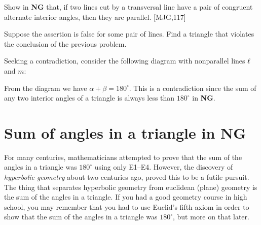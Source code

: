 \documentclass{ximera}
\begin{document}
\begin{problem}
Show in \textbf{NG} that, if two lines cut by a transversal line have
a pair of congruent alternate interior angles, then they are
parallel. [MJG,117]

\begin{hint}
Suppose the assertion is false for some pair of lines. Find a triangle
that violates the conclusion of the previous problem.
\end{hint}
\begin{freeResponse}
Seeking a contradiction, consider the following diagram with
nonparallel lines $\ell$ and $m$:
\begin{image}
\end{image}
From the diagram we have $\alpha + \beta = 180^\circ$. This is a
contradiction since the sum of any two interior angles of a triangle
is always less than $180^\circ$ in \textbf{NG}.
\end{freeResponse}

\end{problem}







\section*{Sum of angles in a triangle in NG}


For many centuries, mathematicians attempted to prove that the sum of
the angles in a triangle was $180^{\circ}$ using only E1--E4. However,
the discovery of \textit{hyperbolic geometry} about two centuries ago,
proved this to be a futile pursuit. The thing that separates
hyperbolic geometry from euclidean (plane) geometry is the sum of the
angles in a triangle. If you had a good geometry course in high
school, you may remember that you had to use Euclid's fifth axiom in
order to show that the sum of the angles in a triangle was
$180^{\circ}$, but more on that later.
\end{document}
